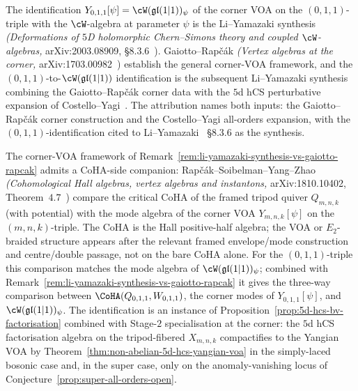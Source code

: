 \begin{remark}[{$Y_{0, 1, 1}[\psi] = \cW(\mathfrak{gl}(1|1))_\psi$ is Li--Yamazaki, not Gaiotto--Rap\v{c}\'ak}]
\label{rem:li-yamazaki-synthesis-vs-gaiotto-rapcak}
The identification $Y_{0, 1, 1}[\psi] = \cW(\mathfrak{gl}(1|1))_\psi$ of the corner VOA on the $(0, 1, 1)$-triple with the $\cW$-algebra at parameter $\psi$ is the Li--Yamazaki synthesis \emph{(Deformations of $5$D holomorphic Chern--Simons theory and coupled $\cW$-algebras,} arXiv:2003.08909, §$8.3.6$~\cite{LiYamazaki2020}\textup{).} Gaiotto--Rap\v{c}\'ak \emph{(Vertex algebras at the corner,} arXiv:1703.00982~\cite{GaiottoRapcak2019}\textup{)} establish the general corner-VOA framework, and the $(0, 1, 1)$-to-$\cW(\mathfrak{gl}(1|1))$ identification is the subsequent Li--Yamazaki synthesis combining the Gaiotto--Rap\v{c}\'ak corner data with the $5$d hCS perturbative expansion of Costello--Yagi~\cite{CostelloYagi2018}. The attribution names both inputs: the Gaiotto--Rap\v{c}\'ak corner construction and the Costello--Yagi all-orders expansion, with the $(0, 1, 1)$-identification cited to Li--Yamazaki~\cite{LiYamazaki2020} §$8.3.6$ as the synthesis.
\end{remark}

\begin{remark}
\label{rem:rsyz-e2-coha-voa-duality}
The corner-VOA framework of Remark~\ref{rem:li-yamazaki-synthesis-vs-gaiotto-rapcak} admits a CoHA-side companion: Rap\v{c}\'ak--Soibelman--Yang--Zhao \emph{(Cohomological Hall algebras, vertex algebras and instantons,} arXiv:1810.10402, Theorem~$4.7$~\cite{RSYZ2020}\textup{)} compare the critical CoHA of the framed tripod quiver $Q_{m, n, k}$ \textup{(}with potential\textup{)} with the mode algebra of the corner VOA $Y_{m, n, k}[\psi]$ on the $(m, n, k)$-triple. The CoHA is the Hall positive-half algebra; the VOA or $E_2$-braided structure appears after the relevant framed envelope/mode construction and centre/double passage, not on the bare CoHA alone. For the $(0, 1, 1)$-triple this comparison matches the mode algebra of $\cW(\mathfrak{gl}(1|1))_\psi$; combined with Remark~\ref{rem:li-yamazaki-synthesis-vs-gaiotto-rapcak} it gives the three-way comparison between $\CoHA(Q_{0,1,1},W_{0,1,1})$, the corner modes of $Y_{0,1,1}[\psi]$, and $\cW(\mathfrak{gl}(1|1))_\psi$. The identification is an instance of Proposition~\ref{prop:5d-hcs-bv-factorisation} combined with Stage-$2$ specialisation at the corner: the $5$d hCS factorisation algebra on the tripod-fibered $X_{m, n, k}$ compactifies to the Yangian VOA by Theorem~\ref{thm:non-abelian-5d-hcs-yangian-voa} in the simply-laced bosonic case and, in the super case, only on the anomaly-vanishing locus of Conjecture~\ref{prop:super-all-orders-open}.
\end{remark}

